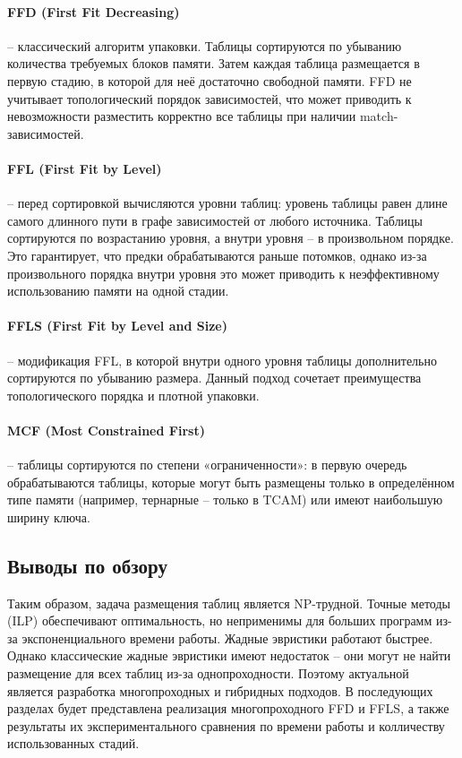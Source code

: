\paragraph{FFD (First Fit Decreasing)} – классический алгоритм упаковки. Таблицы сортируются по убыванию количества требуемых блоков памяти. Затем каждая таблица размещается в первую стадию, в которой для неё достаточно свободной памяти. FFD не учитывает топологический порядок зависимостей, что может приводить к невозможности разместить корректно все таблицы при наличии match-зависимостей.

\paragraph{FFL (First Fit by Level)} – перед сортировкой вычисляются уровни таблиц: уровень таблицы равен длине самого длинного пути в графе зависимостей от любого источника. Таблицы сортируются по возрастанию уровня, а внутри уровня – в произвольном порядке. Это гарантирует, что предки обрабатываются раньше потомков, однако из-за произвольного порядка внутри уровня это может приводить к неэффективному использованию памяти на одной стадии.

\paragraph{FFLS (First Fit by Level and Size)} – модификация FFL, в которой внутри одного уровня таблицы дополнительно сортируются по убыванию размера. Данный подход сочетает преимущества топологического порядка и плотной упаковки. 

\paragraph{MCF (Most Constrained First)} – таблицы сортируются по степени «ограниченности»: в первую очередь обрабатываются таблицы, которые могут быть размещены только в определённом типе памяти (например, тернарные – только в TCAM) или имеют наибольшую ширину ключа.


\subsection{Выводы по обзору}
Таким образом, задача размещения таблиц является NP-трудной. Точные методы (ILP) обеспечивают оптимальность, но неприменимы для больших программ из-за экспоненциального времени работы. Жадные эвристики работают быстрее. Однако классические жадные эвристики имеют недостаток – они могут не найти размещение для всех таблиц из-за однопроходности. Поэтому актуальной является разработка многопроходных и гибридных подходов. В последующих разделах будет представлена реализация многопроходного FFD и FFLS, а также результаты их экспериментального сравнения по времени работы и колличеству использованных стадий.
